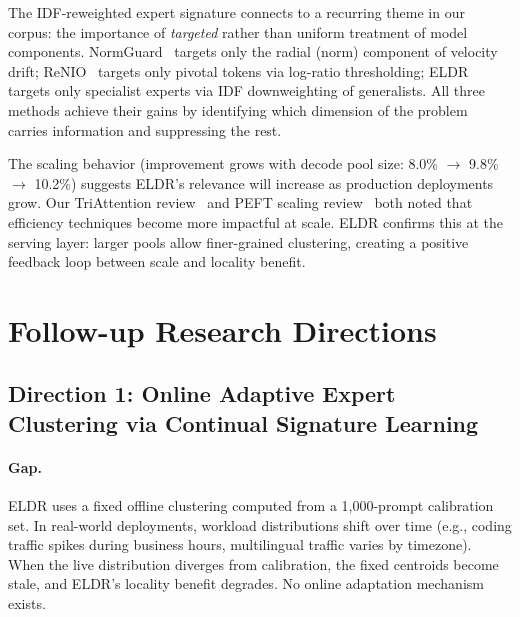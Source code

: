 \documentclass[11pt,a4paper]{article}
\begin{document}
The IDF-reweighted expert signature connects to a recurring theme in our corpus: the importance of \emph{targeted} rather than uniform treatment of model components. NormGuard~\cite{normguard2026} targets only the radial (norm) component of velocity drift; ReNIO~\cite{lin2026renio} targets only pivotal tokens via log-ratio thresholding; ELDR targets only specialist experts via IDF downweighting of generalists. All three methods achieve their gains by identifying which dimension of the problem carries information and suppressing the rest.

The scaling behavior (improvement grows with decode pool size: 8.0\% $\to$ 9.8\% $\to$ 10.2\%) suggests ELDR's relevance will increase as production deployments grow. Our TriAttention review~\cite{triattention2026} and PEFT scaling review~\cite{peft2026} both noted that efficiency techniques become more impactful at scale. ELDR confirms this at the serving layer: larger pools allow finer-grained clustering, creating a positive feedback loop between scale and locality benefit.

\section{Follow-up Research Directions}

\subsection{Direction 1: Online Adaptive Expert Clustering via Continual Signature Learning}

\paragraph{Gap.} ELDR uses a fixed offline clustering computed from a 1,000-prompt calibration set. In real-world deployments, workload distributions shift over time (e.g., coding traffic spikes during business hours, multilingual traffic varies by timezone). When the live distribution diverges from calibration, the fixed centroids become stale, and ELDR's locality benefit degrades. No online adaptation mechanism exists.
\end{document}
